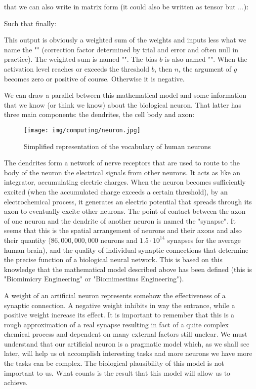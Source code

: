	that we can also write in matrix form (it could also be written as tensor but ...):
	
	Such that finally:
	
	This output is obviously a weighted sum of the weights and inputs less what we name the "" (correction factor determined by trial and error and often null in practice). The weighted sum is named "". The bias $b$ is also named "". When the activation level reaches or exceeds the threshold $b$, then $n$, the argument of $g$ becomes zero or positive of course. Otherwise it is negative.

	We can draw a parallel between this mathematical model and some information that we know (or think we know) about the biological neuron. That latter has three main components: the dendrites, the cell body and axon:	
	\begin{figure}[H]
		\centering
		\texttt{[image: img/computing/neuron.jpg]}
		\caption{Simplified representation of the vocabulary of human neurons}
	\end{figure}
	The dendrites form a network of nerve receptors that are used to route to the body of the neuron the electrical signals from other neurons. It acts as like an integrator, accumulating electric charges. When the neuron becomes sufficiently excited (when the accumulated charge exceeds a certain threshold), by an electrochemical process, it generates an electric potential that spreads through its axon to eventually excite other neurons. The point of contact between the axon of one neuron and the dendrite of another neuron is named the "synapse". It seems that this is the spatial arrangement of neurons and their axons and also their quantity ($86,000,000,000$ neurons and $1.5\cdot 10^{14}$ synapses for the average human brain), and the quality of individual synaptic connections that determine the precise function of a biological neural network. This is based on this knowledge that the mathematical model described above has been defined (this is "Biomimicry Engineering" or "Biomimestims Engineering").
	
	A weight of an artificial neuron represents somehow the effectiveness of a synaptic connection. A negative weight inhibits in way the entrance, while a positive weight increase its effect. It is important to remember that this is a rough approximation of a real synapse resulting in fact of a quite complex chemical process and dependent on many external factors still unclear. We must understand that our artificial neuron is a pragmatic model which, as we shall see later, will help us ot accomplish interesting tasks and more neurons we have more the tasks can be complex. The biological plausibility of this model is not important to us. What counts is the result that this model will allow us to achieve.
	
